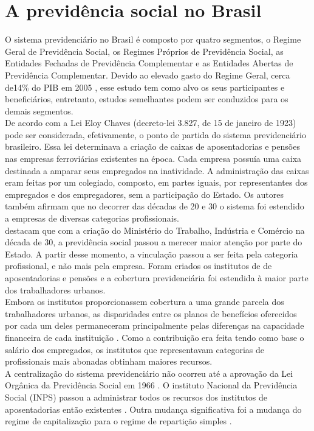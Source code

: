 \documentclass[12pt, 						%
			openright, 					%
			twoside,					%
			a4paper,x					%
			english,					%
			brazil]{abntex2}				%
\begin{document}
	\section{A previdência social no Brasil \label{sec1.1}}
	O sistema previdenciário no Brasil é composto por quatro segmentos, o Regime Geral de Previdência Social, os Regimes Próprios de Previdência Social, as Entidades Fechadas de Previdência Complementar e as Entidades Abertas de Previdência Complementar. Devido ao elevado gasto do Regime Geral, cerca de14\% do PIB em 2005 \cite{queiroz_figoli}, esse estudo tem como alvo os seus participantes e beneficiários, entretanto, estudos semelhantes podem ser conduzidos para os demais segmentos. \\
	De acordo com  a Lei Eloy Chaves (decreto-lei 3.827, de 15 de janeiro de 1923) pode ser considerada, efetivamente, o ponto de partida do sistema previdenciário brasileiro. Essa lei determinava a criação de caixas de aposentadorias e pensões nas empresas ferroviárias existentes na época. Cada empresa possuía uma caixa destinada a amparar seus empregados na inatividade. A administração das caixas eram feitas por um colegiado, composto, em partes iguais, por representantes dos empregados e dos empregadores, sem a participação do Estado. Os autores também afirmam que no decorrer das décadas de 20 e 30 o sistema foi estendido a empresas de diversas categorias profissionais.\\
	 destacam que com a criação do Ministério do Trabalho, Indústria e Comércio na década de 30, a previdência social passou a merecer maior atenção por parte do Estado. A partir desse momento, a vinculação passou a ser feita pela categoria profissional, e não mais pela empresa. Foram criados os institutos de de aposentadorias e pensões e a cobertura previdenciária foi estendida à maior parte dos trabalhadores urbanos. \\
	Embora os institutos proporcionassem cobertura a uma grande parcela dos trabalhadores urbanos, as disparidades entre os planos de benefícios oferecidos por cada um deles permaneceram principalmente pelas diferenças na capacidade financeira de cada instituição \cite{oliveira1997reforma}. Como a contribuição era feita tendo como base o salário dos empregados, os institutos que representavam categorias de profissionais mais abonadas obtinham maiores recursos. \\
	A centralização do sistema previdenciário não ocorreu até a aprovação da Lei Orgânica da Previdência Social em 1966 \cite{oliveira1989previdencia}. O instituto Nacional da Previdência Social (INPS) passou a administrar todos os recursos dos institutos de aposentadorias então existentes \cite{turra2005before}. Outra mudança significativa foi a mudança do regime de capitalização para o regime de repartição simples \cite{leite1983seculo}. \\
\end{document}
